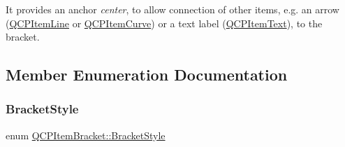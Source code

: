 It provides an anchor {\itshape center}, to allow connection of other items, e.\+g. an arrow (\hyperlink{class_q_c_p_item_line}{Q\+C\+P\+Item\+Line} or \hyperlink{class_q_c_p_item_curve}{Q\+C\+P\+Item\+Curve}) or a text label (\hyperlink{class_q_c_p_item_text}{Q\+C\+P\+Item\+Text}), to the bracket. 

\subsection{Member Enumeration Documentation}
\hypertarget{class_q_c_p_item_bracket_a7ac3afd0b24a607054e7212047d59dbd}{}\label{class_q_c_p_item_bracket_a7ac3afd0b24a607054e7212047d59dbd} 
\subsubsection{\texorpdfstring{Bracket\+Style}{BracketStyle}}
{\footnotesize\ttfamily enum \hyperlink{class_q_c_p_item_bracket_a7ac3afd0b24a607054e7212047d59dbd}{Q\+C\+P\+Item\+Bracket\+::\+Bracket\+Style}}

